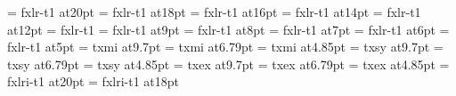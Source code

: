 %
\font\twentyrm=     fxlr-t1 at20pt
\font\eighteenrm=   fxlr-t1 at18pt
\font\sixteenrm=    fxlr-t1 at16pt
\font\fourteenrm=   fxlr-t1 at14pt
\font\twelverm=     fxlr-t1 at12pt
\font\tenrm=        fxlr-t1
\font\ninerm=       fxlr-t1 at9pt
\font\eightrm=      fxlr-t1 at8pt
\font\sevenrm=      fxlr-t1 at7pt
\font\sixrm=        fxlr-t1 at6pt
\font\fiverm=       fxlr-t1 at5pt
%
\def\twentyi{\font\fzzozznzzt=txmi at19.4pt \fzzozznzzt}%
\def\eighteeni{\font\fzzozznzzt=txmi at17.46pt \fzzozznzzt}%
\def\sixteeni{\font\fzzozznzzt=txmi at15.52pt \fzzozznzzt}%
\def\fourteeni{\font\fzzozznzzt=txmi at13.58pt \fzzozznzzt}%
\def\twelvei{\font\fzzozznzzt=txmi at11.64pt \fzzozznzzt}%
\font\teni=         txmi at9.7pt%
\def\ninei{\font\fzzozznzzt=txmi at8.73pt \fzzozznzzt}%
\def\eighti{\font\fzzozznzzt=txmi at7.76pt \fzzozznzzt}%
\font\seveni=       txmi at6.79pt
\def\sixi{\font\fzzozznzzt=txmi at5.82pt \fzzozznzzt}%
\font\fivei=        txmi at4.85pt
%
\def\twentysy{\font\fzzozznzzt=txsy at19.4pt \fzzozznzzt}%
\def\eighteensy{\font\fzzozznzzt=txsy at17.46pt \fzzozznzzt}%
\def\sixteensy{\font\fzzozznzzt=txsy at15.52pt \fzzozznzzt}%
\def\fourteensy{\font\fzzozznzzt=txsy at13.58pt \fzzozznzzt}%
\def\twelvesy{\font\fzzozznzzt=txsy at11.64pt \fzzozznzzt}%
\font\tensy=         txsy at9.7pt%
\def\ninesy{\font\fzzozznzzt=txsy at8.73pt \fzzozznzzt}%
\def\eightsy{\font\fzzozznzzt=txsy at7.76pt \fzzozznzzt}%
\font\sevensy=       txsy at6.79pt
\def\sixsy{\font\fzzozznzzt=txsy at5.82pt \fzzozznzzt}%
\font\fivesy=        txsy at4.85pt
%
\def\twentyex{\font\fzzozznzzt=txex at19.4pt \fzzozznzzt}%
\def\eighteenex{\font\fzzozznzzt=txex at17.46pt \fzzozznzzt}%
\def\sixteenex{\font\fzzozznzzt=txex at15.52pt \fzzozznzzt}%
\def\fourteenex{\font\fzzozznzzt=txex at13.58pt \fzzozznzzt}%
\def\twelveex{\font\fzzozznzzt=txex at11.64pt \fzzozznzzt}%
\font\tenex=         txex at9.7pt%
\def\nineex{\font\fzzozznzzt=txex at8.73pt \fzzozznzzt}%
\def\eightex{\font\fzzozznzzt=txex at7.76pt \fzzozznzzt}%
\font\sevenex=       txex at6.79pt
\def\sixex{\font\fzzozznzzt=txex at5.82pt \fzzozznzzt}%
\font\fiveex=        txex at4.85pt
%
\font\twentyit=     fxlri-t1 at20pt
\font\eighteenit=   fxlri-t1 at18pt
